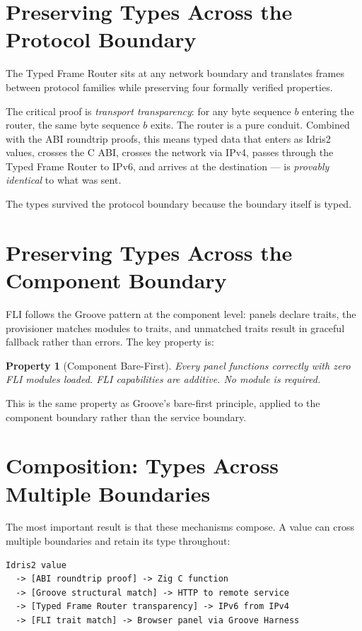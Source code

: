 \documentclass[11pt,a4paper]{article}
\newtheorem{property}{Property}
\begin{document}
\section{Preserving Types Across the Protocol Boundary}
\label{sec:protocol}

The Typed Frame Router sits at any network boundary and translates
frames between protocol families while preserving four formally verified
properties.

The critical proof is \emph{transport transparency}: for any byte
sequence $b$ entering the router, the same byte sequence $b$ exits.
The router is a pure conduit. Combined with the ABI roundtrip proofs,
this means typed data that enters as Idris2 values, crosses the C ABI,
crosses the network via IPv4, passes through the Typed Frame Router to
IPv6, and arrives at the destination --- is \emph{provably identical}
to what was sent.

The types survived the protocol boundary because the boundary itself
is typed.

\section{Preserving Types Across the Component Boundary}
\label{sec:component}

FLI follows the Groove pattern at the component level: panels declare
traits, the provisioner matches modules to traits, and unmatched traits
result in graceful fallback rather than errors. The key property is:

\begin{property}[Component Bare-First]
Every panel functions correctly with zero FLI modules loaded. FLI
capabilities are additive. No module is required.
\end{property}

This is the same property as Groove's bare-first principle, applied
to the component boundary rather than the service boundary.

\section{Composition: Types Across Multiple Boundaries}
\label{sec:composition}

The most important result is that these mechanisms compose. A value
can cross multiple boundaries and retain its type throughout:

\begin{lstlisting}[caption={A value crossing four boundaries}]
Idris2 value
  -> [ABI roundtrip proof] -> Zig C function
  -> [Groove structural match] -> HTTP to remote service
  -> [Typed Frame Router transparency] -> IPv6 from IPv4
  -> [FLI trait match] -> Browser panel via Groove Harness
\end{lstlisting}
\end{document}
